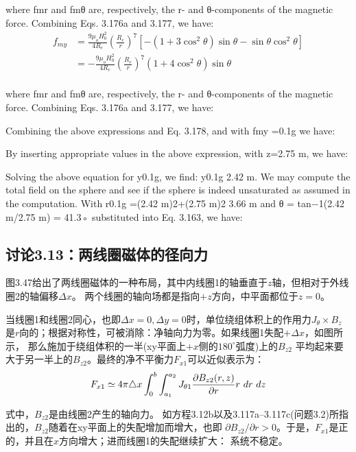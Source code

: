 where fmr and fmθ are, respectively, the r- and θ-components of the magnetic
force. Combining Eqs. 3.176a and 3.177, we have:
\begin{equation}
\begin{split}
f_{my}&=\frac{9\mu_{o}H_{0}^{2}}{4R_{e}}(\frac{R_{e}}{r})^{7}[-(1+3\cos^{2}\theta)\sin\theta-\sin\theta\cos^{2}\theta]\\
&=-\frac{9\mu_{o}H_{0}^{2}}{4R_{e}}(\frac{R_{e}}{r})^{7}(1+4\cos^{2}\theta)\sin\theta\\%
\end{split}
\end{equation}

where fmr and fmθ are, respectively, the r- and θ-components of the magnetic
force. Combining Eqs. 3.176a and 3.177, we have:

Combining the above expressions and Eq. 3.178, and with fmy =0.1g we have:

By inserting appropriate values in the above expression, with z=2.75 m, we have:

Solving the above equation for y0.1g, we find: y0.1g  2.42 m.
We may compute the total field on the sphere and see if the sphere is indeed unsaturated as assumed in the computation. With r0.1g =(2.42 m)2+(2.75 m)2 
3.66 m and θ = tan−1(2.42 m/2.75 m) = 41.3◦ substituted into Eq. 3.163, we have:

\newpage




\subsection{讨论3.13：两线圈磁体的径向力}
图3.47给出了两线圈磁体的一种布局，其中内线圈1的轴垂直于$z$轴，但相对于外线圈2的轴偏移$\Delta x$。
两个线圈的轴向场都是指向$+z$方向，中平面都位于$z=0$。

当线圈1和线圈2同心，也即$\Delta x=0,\Delta y=0$时，单位绕组体积上的作用力$J_\theta \times B_z$
是$r$向的；根据对称性，可被消除：净轴向力为零。如果线圈1失配$+\Delta x$，如图所示，
那么施加于绕组体积的一半(xy平面上$+x$侧的$180^\circ$弧度)上的$B_{z2}$
平均起来要大于另一半上的$B_{z2}$。最终的净不平衡力$F_{x1}$可以近似表示为：
\begin{equation}%
F_{x1}\simeq4\pi\triangle x\int_{0}^{b}\int_{a_{1}}^{a_{2}}J_{\theta1}\frac{\partial B_{z2}(r,z)}{\partial r}r\ dr\ dz\\
\end{equation}

式中，$B_{z2}$是由线圈2产生的轴向力。
如方程3.12b以及3.117a–3.117c(问题3.2)所指出的，$B_{z2}$随着在xy平面上的失配增加而增大，也即
$\partial B_{z2}/\partial r>0$。于是，$F_{x1}$是正的，并且在$x$方向增大；进而线圈1的失配继续扩大：
系统不稳定。

